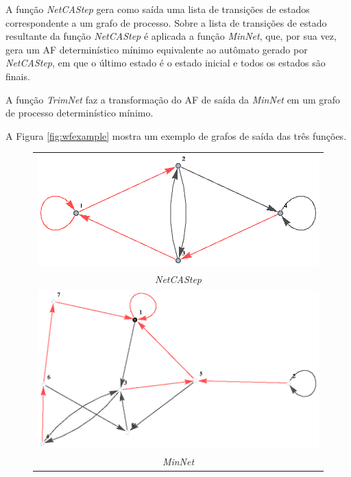 \documentclass[12pt,a4paper]{article}
\begin{document}
A função \emph{NetCAStep} gera como saída uma lista de transições
de estados correspondente a um grafo de processo.
Sobre a lista de transições de estado resultante da função
\emph{NetCAStep} é aplicada a função \emph{MinNet}, que, por sua vez,
gera um AF determinístico mínimo equivalente ao autômato gerado por
\emph{NetCAStep}, em que o último estado é o estado inicial e todos os
estados são finais.

A função \emph{TrimNet} faz a transformação do AF de saída da \emph{MinNet}
em um grafo de processo determinístico mínimo.

A Figura \ref{fig:wfexample} mostra um exemplo de grafos de saída
das três funções.

\begin{center}
\begin{figure}[htp]
\begin{tabular}{c}
\includegraphics[scale=1.0]{img/NetCAStep.eps} \\
\emph{NetCAStep} \\
\includegraphics[scale=1.0]{img/MinNet.eps} \\
\emph{MinNet} \\

\end{tabular}
\end{figure}
\end{center}
\end{document}
